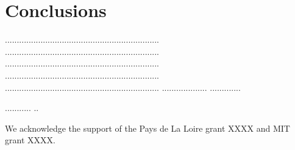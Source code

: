 \documentclass{JINST}
\begin{document}







   



       


\section{Conclusions}
\label{section3}

.................................................................
.................................................................
.................................................................
.................................................................
.................................................................
...................
.............

...........
..

\acknowledgments

       We acknowledge the support of the Pays de La Loire grant XXXX and MIT grant XXXX. 


{}

\end{document}
